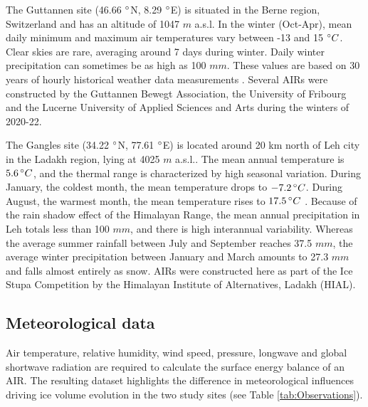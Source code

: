 The Guttannen site (46.66 $^{\circ}$N, 8.29 $^{\circ}$E) is situated in the Berne region, Switzerland and has an
altitude of 1047 $m$ a.s.l. In the winter (Oct-Apr), mean daily minimum and maximum air temperatures vary
between -13 and 15 $^{\circ} C$. Clear skies are rare, averaging around 7 days during winter. Daily winter
precipitation can sometimes be as high as 100 $mm$. These values are based on 30 years of hourly historical
weather data measurements \citep{meteoblueClimateGuttannen2021}. Several AIRs were constructed by the Guttannen
Bewegt Association, the University of Fribourg and the Lucerne University of Applied Sciences and Arts during
the winters of 2020-22.

The Gangles site (34.22 $^{\circ}$N, 77.61 $^{\circ}$E) is located around 20 km north of Leh city in the Ladakh
region, lying at 4025 $m$ a.s.l.. The mean annual temperature is $5.6 \, ^{\circ} C$, and the thermal range is
characterized by high seasonal variation. During January, the coldest month, the mean temperature drops to $-7.2
\, ^{\circ} C$. During August, the warmest month, the mean temperature rises to $17.5 \, ^{\circ} C$
\citep{nusserIrrigationDevelopmentUpper2012}. Because of the rain shadow effect of the Himalayan Range, the mean annual precipitation in
Leh totals less than 100 $mm$, and there is high interannual variability. Whereas the average summer rainfall
between July and September reaches 37.5 $mm$, the average winter precipitation between January and March amounts
to 27.3 $ mm$ and falls almost entirely as snow. AIRs were constructed here as part of the Ice Stupa Competition
by the Himalayan Institute of Alternatives, Ladakh (HIAL). 



\subsection{Meteorological data}

Air temperature, relative humidity, wind speed, pressure, longwave and global shortwave radiation are required
to calculate the surface energy balance of an AIR.  The resulting dataset highlights the difference in
meteorological influences driving ice volume evolution in the two study sites (see Table
\ref{tab:Observations}).

